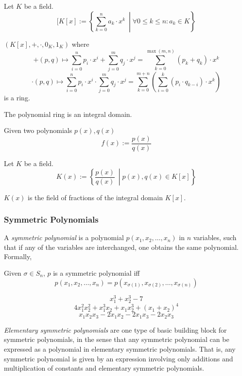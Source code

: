 \begin{definition}
   Let \(K\) be a field.
   \[[K[x] := \left\{\sum_{k=0}^n a_k \cdot x^k ~\middle| \forall 0 \leq k \leq n: a_k \in K\right\}\]
\end{definition}

\begin{proposition}
   \((K[x], +, \cdot, 0_K, 1_K)\) where
   \[+(p, q) \mapsto \sum_{i=0}^n p_i \cdot x^i + \sum_{j=0}^m q_j \cdot x^j = \sum_{k=0}^{\max(m,n)} (p_k + q_k) \cdot x^k\]
   \[\cdot(p, q) \mapsto \sum_{i=0}^n p_i \cdot x^i \cdot \sum_{j=0}^m q_j \cdot x^j = \sum_{k=0}^{m+n} \left(\sum_{i=0}^k (p_i \cdot q_{k-i}) \cdot x^k\right)\]
   is a ring.
\end{proposition}
\begin{remark}
   The polynomial ring is an integral domain.
\end{remark}

\begin{definition}
   Given two polynomials \(p(x), q(x)\)
   \[f(x) := \frac{p(x)}{q(x)}\]
\end{definition}

\begin{definition}
   Let \(K\) be a field.
   \[K(x) := \left\{\frac{p(x)}{q(x)} ~\middle| p(x), q(x) \in K[x]\right\}\]
\end{definition}
\begin{remark}
   \(K(x)\) is the field of fractions of the integral domain \(K[x]\).
\end{remark}

\subsubsection{Symmetric Polynomials}
A \emph{symmetric polynomial} is a polynomial \(p(x_1, x_2, \ldots, x_n)\) in \(n\) variables, such that if any of the variables are interchanged, one obtains the same polynomial.
Formally,
\begin{definition}
   Given \(\sigma \in S_n\), \(p\) is a symmetric polynomial iff
   \[p(x_1, x_2, \ldots, x_n) = p(x_{\sigma(1)}, x_{\sigma(2)}, \ldots, x_{\sigma(n)})\]
\end{definition}
\begin{example}
   \[x_1^3 + x_2^3-7\]
   \[4x_1^2x_2^2 + x_1^3x_2 + x_1x_2^3 + (x_1 + x_2)^4\]
   \[x_1x_2x_3 - 2x_1x_2 - 2x_1x_3 - 2x_2x_3\]
\end{example}
\emph{Elementary symmetric polynomials} are one type of basic building block for symmetric polynomials, in the sense that any symmetric polynomial can be expressed as a polynomial in elementary symmetric polynomials.
That is, any symmetric polynomial is given by an expression involving only additions and multiplication of constants and elementary symmetric polynomials.


